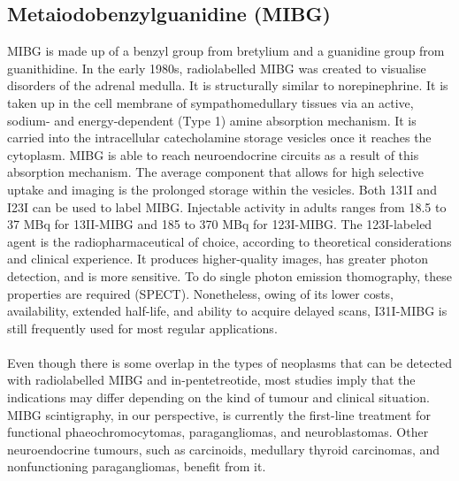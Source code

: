 \documentclass{article}
\begin{document}
\begin{multicols}{2}
\subsection{Metaiodobenzylguanidine (MIBG)}
MIBG is made up of a benzyl group from bretylium and a guanidine group from guanithidine. In the early 1980s, radiolabelled MIBG was created to visualise disorders of the adrenal medulla. It is structurally similar to norepinephrine. It is taken up in the cell membrane of sympathomedullary tissues via an active, sodium- and energy-dependent (Type 1) amine absorption mechanism. It is carried into the intracellular catecholamine storage vesicles once it reaches the cytoplasm. MIBG is able to reach neuroendocrine circuits as a result of this absorption mechanism. The average component that allows for high selective uptake and imaging is the prolonged storage within the vesicles. Both 131I and I23I can be used to label MIBG. Injectable activity in adults ranges from 18.5 to 37 MBq for 13II-MIBG and 185 to 370 MBq for 123I-MIBG\cite{carvao2021neuroendocrine}. The 123I-labeled agent is the radiopharmaceutical of choice, according to theoretical considerations and clinical experience. It produces higher-quality images, has greater photon detection, and is more sensitive. To do single photon emission thomography, these properties are required (SPECT). Nonetheless, owing of its lower costs, availability, extended half-life, and ability to acquire delayed scans, I31I-MIBG is still frequently used for most regular applications. \\ \\
Even though there is some overlap in the types of neoplasms that can be detected with radiolabelled MIBG and in-pentetreotide, most studies imply that the indications may differ depending on the kind of tumour and clinical situation. MIBG scintigraphy, in our perspective, is currently the first-line treatment for functional phaeochromocytomas, paragangliomas, and neuroblastomas. Other neuroendocrine tumours, such as carcinoids, medullary thyroid carcinomas, and nonfunctioning paragangliomas, benefit from it\cite{board2002pancreatic}.


\end{multicols}
\end{document}
